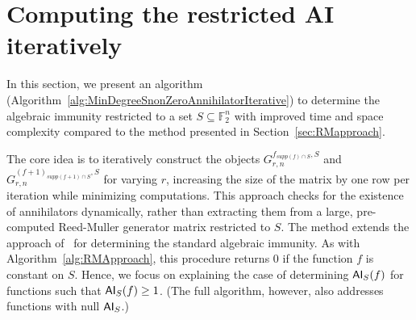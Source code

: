 \documentclass[11pt]{llncs}
\begin{document}






\section{Computing the restricted AI iteratively}\label{sec:IterativeApproach}






In this section, we present an algorithm (Algorithm~\ref{alg:MinDegreeSnonZeroAnnihilatorIterative}) to determine the algebraic immunity restricted to a set $S \subseteq \mathbb{F}_2^n$ with improved time and space complexity compared to the method presented in Section~\ref{sec:RMapproach}. 

The core idea is to iteratively construct the objects $G_{r,n}^{f_{supp\left(f\right) \cap S},S}$ and $G_{r,n}^{\left(f+ 1\right)_{supp\left(f+ 1\right) \cap S},S}$ for varying $r$, increasing the size of the matrix by one row per iteration while minimizing computations. 
This approach checks for the existence of annihilators dynamically, rather than extracting them from a large, pre-computed Reed-Muller generator matrix restricted to $S$. The method extends the approach of~\cite{EC:ACGKMR06} for determining the standard algebraic immunity.
As with Algorithm~\ref{alg:RMApproach}, this procedure returns $0$ if the function $f$ is constant on $S$. Hence, we focus on explaining the case of determining $\mathsf{AI}_S(f)$ for functions such that $\mathsf{AI}_S(f) \geq 1$. (The full algorithm, however, also addresses functions with null $\mathsf{AI}_S$.)
\end{document}
